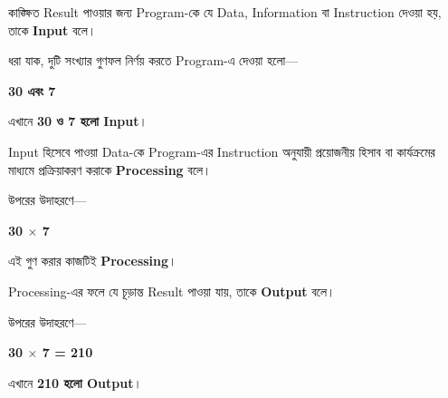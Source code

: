 
কাঙ্ক্ষিত Result পাওয়ার জন্য Program-কে যে Data, Information
বা Instruction দেওয়া হয়, তাকে \textbf{Input} বলে।

ধরা যাক, দুটি সংখ্যার গুণফল নির্ণয় করতে Program-এ দেওয়া হলো—

\begin{center}

\textbf{30 এবং 7}

\end{center}

এখানে \textbf{30 ও 7 হলো Input}।


Input হিসেবে পাওয়া Data-কে Program-এর Instruction অনুযায়ী
প্রয়োজনীয় হিসাব বা কার্যক্রমের মাধ্যমে প্রক্রিয়াকরণ করাকে
\textbf{Processing} বলে।

উপরের উদাহরণে—

\begin{center}

\textbf{
30
\(\times\)
7
}

\end{center}

এই গুণ করার কাজটিই \textbf{Processing}।


Processing-এর ফলে যে চূড়ান্ত Result পাওয়া যায়, তাকে
\textbf{Output} বলে।

উপরের উদাহরণে—

\begin{center}

\textbf{
30
\(\times\)
7
=
210
}

\end{center}

এখানে \textbf{210 হলো Output}।

